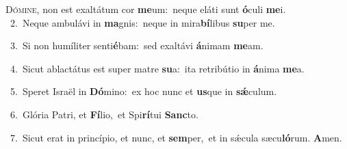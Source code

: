 \lettrine{\initial\textcolor{\initialcolor}{D}}{ómine,} non est exaltátum cor \textbf{me}\-um:~\star neque eláti sunt \textbf{ó}\-culi \textbf{me}\-i.\\
{\numbfont\textcolor{\numbcolor}{~2.}}~Neque ambulávi in \textbf{ma}\-gnis:~\star neque in mira\-\textbf{bí}\-libus \textbf{su}\-per me.\par
{\numbfont\textcolor{\numbcolor}{~3.}}~Si non humíliter senti\-\textbf{é}\-bam:~\star sed exaltávi \textbf{á}\-nimam \textbf{me}\-am.\par
{\numbfont\textcolor{\numbcolor}{~4.}}~Sicut ablactátus est super matre \textbf{su}\-a:~\star ita retribútio in \textbf{á}\-nima \textbf{me}\-a.\par
{\numbfont\textcolor{\numbcolor}{~5.}}~Speret Israël in \textbf{Dó}\-mino:~\star ex hoc nunc et \textbf{us}\-que in \textbf{sǽ}\-culum.\par
{\numbfont\textcolor{\numbcolor}{~6.}}~Glória Patri, et \textbf{Fí}\-lio,~\star et Spi\-\textbf{rí}\-tui \textbf{Sanc}\-to.\par
{\numbfont\textcolor{\numbcolor}{~7.}}~Sicut erat in princípio, et nunc, et \textbf{sem}\-per,~\star et in sǽcula sæcu\-\textbf{ló}\-rum. \textbf{A}\-men.\par
